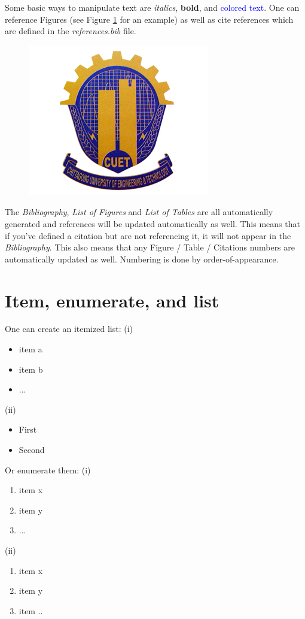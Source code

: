 Some basic ways to manipulate text are \textit{italics}, \textbf{bold}, and \textcolor{blue}{colored text}. One can reference Figures (see Figure \ref{logo} for an example) as well as cite references which are defined in the \textit{references.bib} file.\cite{spectre,example-reference} 
\begin{center}
    \begin{figure}[ht] \label{logo}
\centering
\includegraphics[width=2 in]{figures/logo.jpg}
\centering
\end{figure} 
\end{center}
The \textit{Bibliography}, \textit{List of Figures} and \textit{List of Tables} are all automatically generated and references will be updated automatically as well. This means that if you've defined a citation but are not referencing it, it will not appear in the \textit{Bibliography}. This also means that any Figure / Table / Citations numbers are automatically updated as well. Numbering is done by order-of-appearance.
\section{Item, enumerate, and list}
One can create an itemized list:
(i) \begin{itemize}
    \item item a
    \item item b
    \item ...
\end{itemize}
(ii)
\begin{itemize}[label=]
\item First
\item Second
\end{itemize}
Or enumerate them:
(i) \begin{enumerate}
    \item item x
    \item item y
    \item ...
\end{enumerate}


(ii) \begin{enumerate}[label=\roman*]
  \item item x
  \item item y
  \item item ..
\end{enumerate}

